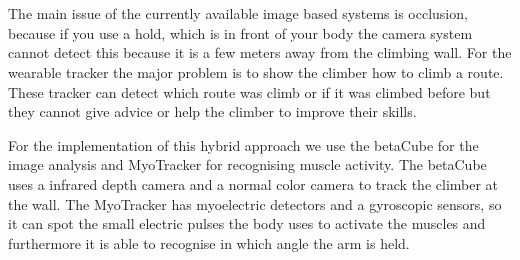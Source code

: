 \\



\\
The main issue of the currently available image based systems is occlusion, because if you use a hold, which is in front of your body the camera system cannot detect this because it is a few meters away from the climbing wall.
For the wearable tracker the major  problem is to show the climber how to climb a route.
These tracker can detect which route was climb or if it was climbed before but they cannot give advice or help the climber to improve their skills.

For the implementation of this hybrid approach we use the betaCube for the image analysis and MyoTracker for recognising muscle activity.
The betaCube uses a infrared depth camera and a normal color camera to track the climber at the wall.
The MyoTracker has myoelectric detectors and a gyroscopic sensors, so it can spot the small electric pulses the body uses to activate the muscles and furthermore it is able to recognise in which angle the arm is held.
